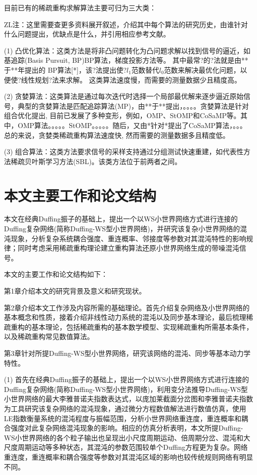 目前已有的稀疏重构求解算法主要可归为三大类： 

\textcolor[rgb]{0.00,0.00,1.00}{ZL注：这里需要查更多资料展开叙述，介绍其中每个算法的研究历史，由谁针对什么问题提出，优缺点是什么，并引用相应参考文献。}

(1)	凸优化算法：这类方法是将非凸问题转化为凸问题求解以找到信号的逼近，如基追踪(Basis Pursuit, BP)BP算法，梯度投影方法等。
\textcolor[rgb]{0.00,0.00,1.00}{其中最常?的?法就是由**于**年提出的 BP算法[*]，该?法提出使?$l_1$范数替代$l_0$范数来解决最优化问题，以便使?线性规划?法来求解。}
这类算法速度慢，而需要的测量数据少且精度高。

(2)	贪婪算法：这类算法是通过每次迭代时选择一个局部最优解来逐步逼近原始信号，\textcolor[rgb]{0.00,0.00,1.00}{典型的贪婪算法是匹配追踪算法(MP)，由**于**提出，。。。。贪婪算法是针对组合优化提出, 目前已发展了多种变形，例如，OMP、StOMP和CoSaMP等。其中，OMP算法。。。。。StOMP。。。。。随后，又由*针对*提出了CoSaMP算法，。。。}
总的来说，贪婪类稀疏重构算法速度快, 然而需要的测量数据多且精度低。

(3)	组合算法：这类方法要求信号的采样支持通过分组测试快速重建，\textcolor[rgb]{0.00,0.00,1.00}{如代表性方法稀疏贝叶斯学习方法(SBL)。该类方法位于前两者之间。}


\section{本文主要工作和论文结构}
本文在经典Duffing振子的基础上，提出一个以WS小世界网络方式进行连接的Duffing复杂网络(简称Duffing-WS型小世界网络)，并研究该复杂小世界网络的混沌现象，分析复杂系统耦合强度、重连概率、邻接度等参数对其混沌特性的影响规律；同时考虑采用稀疏重构理论建立重构算法还原小世界网络生成的带噪混沌信号。

本文的主要工作和论文结构如下：

第1章介绍本文的研究背景及意义和研究现状。

第2章介绍本文工作涉及内容所需的基础理论。首先介绍复杂网络及小世界网络的基本概念和性质，接着介绍非线性动力系统的混沌以及同步基本理论，最后梳理稀疏重构的基本理论，包括稀疏重构的基本数学模型、实现稀疏重构所需基本条件，以及稀疏重构常见数值算法。

第3章针对所提Duffing-WS型小世界网络，研究该网络的混沌、同步等基本动力学特性。

(1) 首先在经典Duffing振子的基础上，提出一个以WS小世界网络方式进行连接的Duffing复杂网络(简称Duffing-WS型小世界网络)，利用变分法推导Duffing-WS型小世界网络的最大李雅普诺夫指数表达式，以庞加莱截面分岔图和李雅普诺夫指数为工具研究该复杂网络的混沌现象，通过微分方程数值解法进行数值仿真，使用LE指数衡量系统的混沌程度与振幅范围，分析小世界网络重连度，重连概率和耦合强度对此复杂网络混沌现象的影响。相应的仿真分析表明，本文所提Duffing-WS小世界网络的各个粒子输出也呈现出小尺度周期运动、倍周期分岔、混沌和大尺度周期运动等多种状态，其混沌的参数范围较单个Duffing方程更为复杂。网络重连度，重连概率和耦合强度等参数对其混沌区域的影响也较传统规则网络有明显不同。


